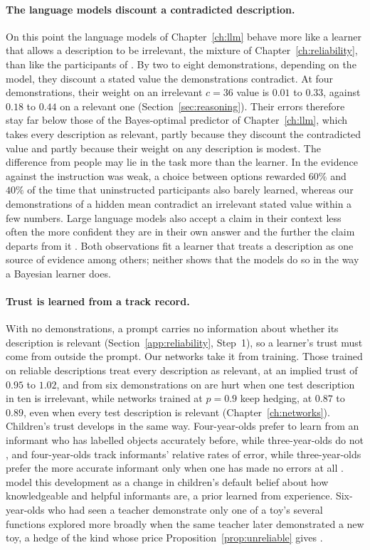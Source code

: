 \paragraph{The language models discount a contradicted description.} On this point the language models of Chapter~\ref{ch:llm} behave more like a learner that allows a description to be irrelevant, the mixture of Chapter~\ref{ch:reliability}, than like the participants of \citet{doll2009}. By two to eight demonstrations, depending on the model, they discount a stated value the demonstrations contradict. At four demonstrations, their weight on an irrelevant $c = 36$ value is $0.01$ to $0.33$, against $0.18$ to $0.44$ on a relevant one (Section~\ref{sec:reasoning}). Their errors therefore stay far below those of the Bayes-optimal predictor of Chapter~\ref{ch:llm}, which takes every description as relevant, partly because they discount the contradicted value and partly because their weight on any description is modest. The difference from people may lie in the task more than the learner. In \citet{doll2009} the evidence against the instruction was weak, a choice between options rewarded $60\%$ and $40\%$ of the time that uninstructed participants also barely learned, whereas our demonstrations of a hidden mean contradict an irrelevant stated value within a few numbers. Large language models also accept a claim in their context less often the more confident they are in their own answer and the further the claim departs from it \citep{wu2024clasheval}. Both observations fit a learner that treats a description as one source of evidence among others; neither shows that the models do so in the way a Bayesian learner does.

\paragraph{Trust is learned from a track record.} With no demonstrations, a prompt carries no information about whether its description is relevant (Section~\ref{app:reliability}, Step~1), so a learner's trust must come from outside the prompt. Our networks take it from training. Those trained on reliable descriptions treat every description as relevant, at an implied trust of $0.95$ to $1.02$, and from six demonstrations on are hurt when one test description in ten is irrelevant, while networks trained at $p = 0.9$ keep hedging, at $0.87$ to $0.89$, even when every test description is relevant (Chapter~\ref{ch:networks}). Children's trust develops in the same way. Four-year-olds prefer to learn from an informant who has labelled objects accurately before, while three-year-olds do not \citep{koenig2005}, and four-year-olds track informants' relative rates of error, while three-year-olds prefer the more accurate informant only when one has made no errors at all \citep{pasquini2007}. \citet{shafto2012trust} model this development as a change in children's default belief about how knowledgeable and helpful informants are, a prior learned from experience. Six-year-olds who had seen a teacher demonstrate only one of a toy's several functions explored more broadly when the same teacher later demonstrated a new toy, a hedge of the kind whose price Proposition~\ref{prop:unreliable} gives \citep{gweon2014}.

